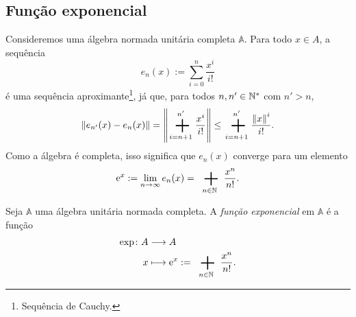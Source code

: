 \subsection{Função exponencial}

Consideremos uma álgebra normada unitária completa $\mathbb A$. Para todo $x \in A$, a sequência
	\begin{equation*}
	e_n(x) := \sum_{i=0}^{n} \frac{x^i}{i!}
	\end{equation*}
é uma sequência aproximante\footnote{Sequência de Cauchy.}, já que, para todos $n,n' \in \mathbb{N}^*$ com $n' > n$,
	\begin{equation*}
	\nor{e_{n'}(x)-e_n(x)} = \nor{\sum_{i=n+1}^{n'} \frac{x^i}{i!}} \leq \sum_{i=n+1}^{n'} \frac{\nor{x}^i}{i!}.
	\end{equation*}
Como a álgebra é completa, isso significa que $e_n(x)$ converge para um elemento
	\begin{equation*}
	\ee^{x} := \lim_{n \to \infty} e_n(x) = \sum_{n \in \N} \frac{x^n}{n!}.
	\end{equation*}

\begin{definition}
Seja $\mathbb A$ uma álgebra unitária normada completa. A \emph{função exponencial} em $\mathbb A$ é a função
	\begin{align*}
	\func{\exp}{A}{A}{x}{\ee^{x} := \sum_{n \in \N} \frac{x^n}{n!}.}
	\end{align*}
\end{definition}

